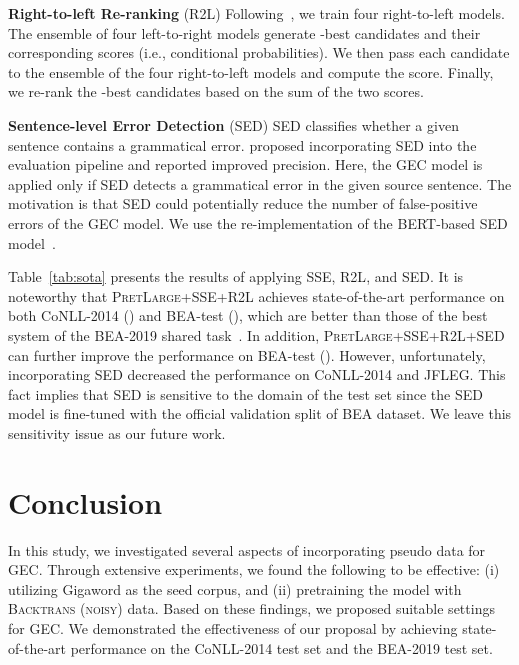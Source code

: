 \documentclass[11pt,a4paper]{article}
\newcommand{\backtrans}{\textsc{Backtrans (noisy)}}
\newcommand{\spell}{\textsc{SSE}}
\begin{document}
\noindent\textbf{Right-to-left Re-ranking} (\textsc{R2L})\hspace*{3mm} 
Following~\citet{sennrich:2016:wmt,sennrich:2017:wmt,grundkiewicz:2019:bea}, we train four right-to-left models.
The ensemble of four left-to-right models generate -best candidates and their corresponding scores (i.e., conditional probabilities).
We then pass each candidate to the ensemble of the four right-to-left models and compute the score.
Finally, we re-rank the -best candidates based on the sum of the two scores.

\noindent\textbf{Sentence-level Error Detection} (\textsc{SED})\hspace*{3mm}
\textsc{SED} classifies whether a given sentence contains a grammatical error.
\citet{asano:2019:bea} proposed incorporating \textsc{SED} into the evaluation pipeline and reported improved precision.
Here, the GEC model is applied only if SED detects a grammatical error in the given source sentence.
The motivation is that \textsc{SED} could potentially reduce the number of false-positive errors of the GEC model.
We use the re-implementation of the BERT-based SED model~\citep{asano:2019:bea}.


Table~\ref{tab:sota} presents the results of applying \textsc{SSE}, \textsc{R2L}, and \textsc{SED}.
It is noteworthy that \textsc{PretLarge}+\spell{}+\textsc{R2L} achieves state-of-the-art performance on both CoNLL-2014 () and BEA-test (), which are better than those of the best system of the BEA-2019 shared task~\citep{grundkiewicz:2019:bea}.
In addition, \textsc{PretLarge}+\spell{}+\textsc{R2L}+\textsc{SED} can further improve the performance on BEA-test ().
However, unfortunately, incorporating \textsc{SED} decreased the performance on CoNLL-2014 and JFLEG.
This fact implies that \textsc{SED} is sensitive to the domain of the test set since the \textsc{SED} model is fine-tuned with the official validation split of BEA dataset.
We leave this sensitivity issue as our future work.










\section{Conclusion}
In this study, we investigated several aspects of incorporating pseudo data for GEC.
Through extensive experiments, we found the following to be effective:
(i) utilizing Gigaword as the seed corpus, and
(ii) pretraining the model with \backtrans{} data.
Based on these findings, we proposed suitable settings for GEC.
We demonstrated the effectiveness of our proposal by achieving state-of-the-art performance on the CoNLL-2014 test set and the BEA-2019 test set.
\end{document}
